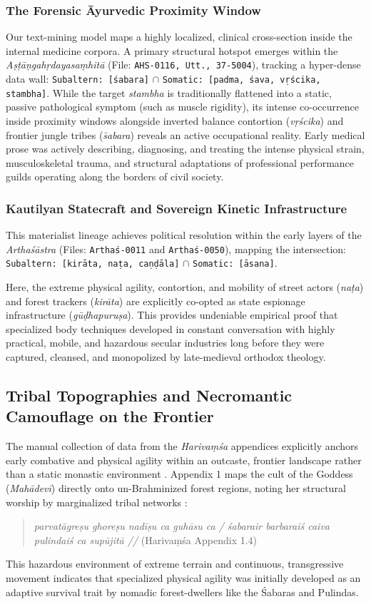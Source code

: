 \documentclass[11pt,twoside,letterpaper]{article}
\begin{document}
\subsubsection{The Forensic Āyurvedic Proximity Window}
Our text-mining model maps a highly localized, clinical cross-section inside the internal medicine corpora. A primary structural hotspot emerges within the \textit{Aṣṭāṇgahṛdayasaṃhitā} (File: \texttt{AHS-0116, Utt., 37-5004}), tracking a hyper-dense data wall: \texttt{Subaltern: [śabara]} $\cap$ \texttt{Somatic: [padma, śava, vṛścika, stambha]}. While the target \textit{stambha} 
is traditionally flattened into a static, passive pathological symptom (such as muscle rigidity), its intense co-occurrence inside proximity windows alongside inverted balance contortion (\textit{vṛścika}) and frontier jungle tribes (\textit{s̄abara}) reveals an active occupational reality. Early medical prose was actively describing, diagnosing, and treating the intense physical strain, musculoskeletal trauma, and structural adaptations of professional performance guilds operating along the borders of civil society.

\subsubsection{Kautilyan Statecraft and Sovereign Kinetic Infrastructure}
This materialist lineage achieves political resolution within the early layers of the \textit{Arthaśāstra} (Files: \texttt{Arthaś-0011} and \texttt{Arthaś-0050}), mapping the intersection: \texttt{Subaltern: [kirāta, naṭa, caṇḍāla]} $\cap$ \texttt{Somatic: [āsana]}. 

Here, the extreme physical agility, contortion, and mobility of street actors (\textit{naṭa}) and forest trackers (\textit{kirāta}) are explicitly co-opted as state espionage infrastructure (\textit{gūḍhapuruṣa}). This provides undeniable empirical proof that specialized body techniques developed in constant conversation with highly practical, mobile, and hazardous secular industries long before they were captured, cleansed, and monopolized by late-medieval orthodox theology.

\subsection{Tribal Topographies and Necromantic Camouflage on the Frontier}
The manual collection of data from the \textit{Harivaṃśa} appendices explicitly anchors early combative and physical agility within an outcaste, frontier landscape rather than a static monastic environment \citep{McCartney2026}. Appendix 1 maps the cult of the Goddess (\textit{Mahādevī}) directly onto un-Brahminized forest regions, noting her structural worship by marginalized tribal networks \citep{HV_App}:
\begin{quote}
\textit{parvatāgreṣu ghoreṣu nadīṣu ca guhāsu ca / śabarair barbaraiś caiva pulindaiś ca supūjitā //} (Harivaṃśa Appendix 1.4)
\end{quote}
This hazardous environment of extreme terrain and continuous, transgressive movement indicates that specialized physical agility was initially developed as an adaptive survival trait by nomadic forest-dwellers like the Śabaras and Pulindas.
\end{document}
